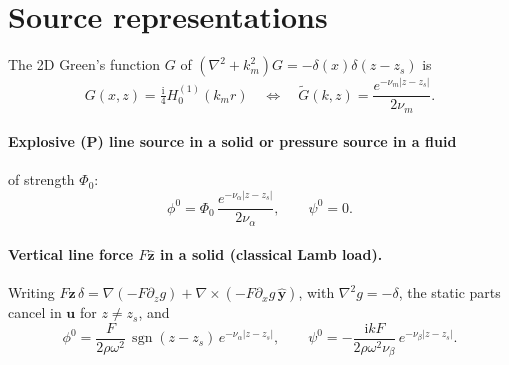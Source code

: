 \documentclass[11pt,a4paper]{article}
\newcommand{\ii}{\mathrm{i}}
\newcommand{\sgn}{\operatorname{sgn}}
\begin{document}
\section{Source representations}

The 2D Green's function $G$ of $(\nabla^2+k_m^2)G=-\delta(x)\delta(z-z_s)$ is
\begin{equation}
  G(x,z)=\tfrac{\ii}{4}H_0^{(1)}(k_m r)
  \quad\Longleftrightarrow\quad
  \tilde G(k,z)=\frac{e^{-\nu_m|z-z_s|}}{2\nu_m}.
\end{equation}

\paragraph{Explosive (P) line source in a solid or pressure source in a fluid} of strength $\Phi_0$:
\begin{equation}
  \phi^0=\Phi_0\,\frac{e^{-\nu_\alpha|z-z_s|}}{2\nu_\alpha},\qquad \psi^0=0 .
\end{equation}

\paragraph{Vertical line force $F\hat{\mathbf z}$ in a solid (classical Lamb load).}
Writing $F\hat{\mathbf z}\,\delta=\nabla(-F\partial_z g)+\nabla\times(-F\partial_x g\,\hat{\mathbf y})$,
with $\nabla^2 g=-\delta$, the static parts cancel in $\mathbf u$ for $z\ne z_s$, and
\begin{equation}
  \phi^0=\frac{F}{2\rho\omega^2}\,\sgn(z-z_s)\,e^{-\nu_\alpha|z-z_s|},\qquad
  \psi^0=-\frac{\ii kF}{2\rho\omega^2\nu_\beta}\,e^{-\nu_\beta|z-z_s|}.
\end{equation}
\end{document}
